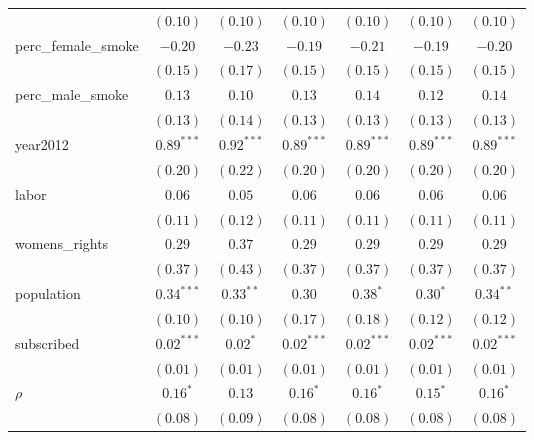 \begin{table}[!h]
\begin{center}
\begin{tabular}{l c c c c c c }
                        & $(0.10)$     & $(0.10)$     & $(0.10)$     & $(0.10)$     & $(0.10)$     & $(0.10)$     \\
perc\_female\_smoke     & $-0.20$      & $-0.23$      & $-0.19$      & $-0.21$      & $-0.19$      & $-0.20$      \\
                        & $(0.15)$     & $(0.17)$     & $(0.15)$     & $(0.15)$     & $(0.15)$     & $(0.15)$     \\
perc\_male\_smoke       & $0.13$       & $0.10$       & $0.13$       & $0.14$       & $0.12$       & $0.14$       \\
                        & $(0.13)$     & $(0.14)$     & $(0.13)$     & $(0.13)$     & $(0.13)$     & $(0.13)$     \\
year2012                & $0.89^{***}$ & $0.92^{***}$ & $0.89^{***}$ & $0.89^{***}$ & $0.89^{***}$ & $0.89^{***}$ \\
                        & $(0.20)$     & $(0.22)$     & $(0.20)$     & $(0.20)$     & $(0.20)$     & $(0.20)$     \\
labor                   & $0.06$       & $0.05$       & $0.06$       & $0.06$       & $0.06$       & $0.06$       \\
                        & $(0.11)$     & $(0.12)$     & $(0.11)$     & $(0.11)$     & $(0.11)$     & $(0.11)$     \\
womens\_rights          & $0.29$       & $0.37$       & $0.29$       & $0.29$       & $0.29$       & $0.29$       \\
                        & $(0.37)$     & $(0.43)$     & $(0.37)$     & $(0.37)$     & $(0.37)$     & $(0.37)$     \\
population              & $0.34^{***}$ & $0.33^{**}$  & $0.30$       & $0.38^{*}$   & $0.30^{*}$   & $0.34^{**}$  \\
                        & $(0.10)$     & $(0.10)$     & $(0.17)$     & $(0.18)$     & $(0.12)$     & $(0.12)$     \\
subscribed              & $0.02^{***}$ & $0.02^{*}$   & $0.02^{***}$ & $0.02^{***}$ & $0.02^{***}$ & $0.02^{***}$ \\
                        & $(0.01)$     & $(0.01)$     & $(0.01)$     & $(0.01)$     & $(0.01)$     & $(0.01)$     \\
$\rho$                  & $0.16^{*}$   & $0.13$       & $0.16^{*}$   & $0.16^{*}$   & $0.15^{*}$   & $0.16^{*}$   \\
                        & $(0.08)$     & $(0.09)$     & $(0.08)$     & $(0.08)$     & $(0.08)$     & $(0.08)$     \\

\end{tabular}
\end{center}
\end{table}
